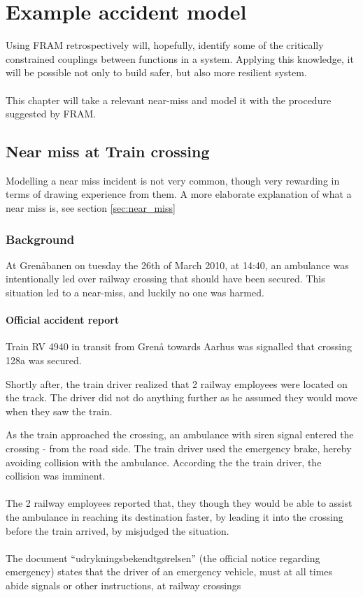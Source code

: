 \documentclass[10pt,oneside]{book}                  %
\begin{document}
\chapter{Example accident model}
\label{ch:accident_model}
Using FRAM retrospectively will, hopefully, identify some of the critically constrained couplings between functions in a system. Applying this knowledge, it will be possible not only to build safer, but also more resilient system.\\
\\
This chapter will take a relevant near-miss and model it with the procedure suggested by FRAM. 

\section{Near miss at Train crossing}
Modelling a near miss incident is not very common, though very rewarding in terms of drawing experience from them. A more elaborate explanation of what a near miss is, see section \ref{sec:near_miss}


\subsection{Background}
At Grenåbanen on tuesday the 26th of March 2010, at 14:40, an ambulance was intentionally led over railway crossing that should have been secured. This situation led to a near-miss, and luckily no one was harmed.

\subsubsection{Official accident report}
Train RV 4940 in transit from Grenå towards Aarhus was signalled that crossing 128a was secured.

Shortly after, the train driver realized that 2 railway employees were located on the track. The driver did not do anything further as he assumed they would move when they saw the train.

As the train approached the crossing, an ambulance with siren signal entered the crossing - from the road side. The train driver used the emergency brake, hereby avoiding collision with the ambulance. According the the train driver, the collision was imminent.\\
\\
The 2 railway employees reported that, they though they would be able to assist the ambulance in reaching its destination faster, by leading it into the crossing before the train arrived, by misjudged the situation.\\
\\
The document ``udrykningsbekendtgørelsen'' (the official notice regarding emergency) states that the driver of an emergency vehicle, must at all times abide signals or other instructions, at railway crossings
\end{document}
